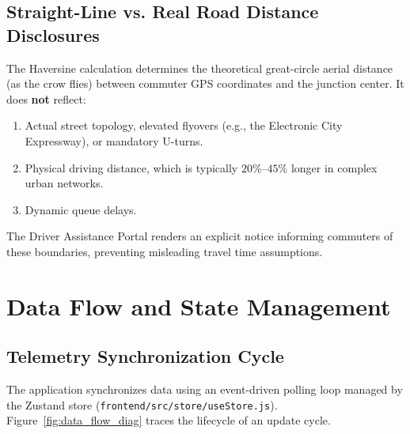 \documentclass[11pt,a4paper,oneside]{report}
\begin{document}
\section{Straight-Line vs. Real Road Distance Disclosures}
\begin{conceptbox}
The Haversine calculation determines the theoretical great-circle aerial distance (as the crow flies) between commuter GPS coordinates and the junction center. It does \textbf{not} reflect:
\begin{enumerate}
    \item Actual street topology, elevated flyovers (e.g., the Electronic City Expressway), or mandatory U-turns.
    \item Physical driving distance, which is typically $20\%\text{--}45\%$ longer in complex urban networks.
    \item Dynamic queue delays.
\end{enumerate}
The Driver Assistance Portal renders an explicit notice informing commuters of these boundaries, preventing misleading travel time assumptions.
\end{conceptbox}



\chapter{Data Flow and State Management}

\section{Telemetry Synchronization Cycle}
The application synchronizes data using an event-driven polling loop managed by the Zustand store (\texttt{frontend/src/store/useStore.js}). Figure~\ref{fig:data_flow_diag} traces the lifecycle of an update cycle.
\end{document}
